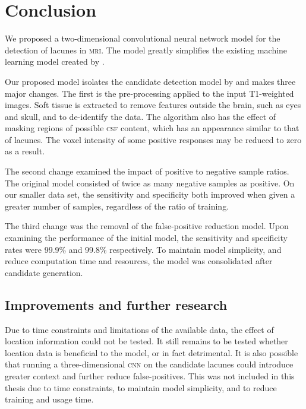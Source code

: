 %
%

\chapter{Conclusion}\label{conclusion}

We proposed a two-dimensional convolutional neural network model for the detection of lacunes in \textsc{mri}. The model greatly simplifies the existing machine learning model created by \cite{GhafoorianM.2017Dml3}.

Our proposed model isolates the candidate detection model by \cite{GhafoorianM.2017Dml3} and makes three major changes. The first is the pre-processing applied to the input T1-weighted images. Soft tissue is extracted to remove features outside the brain, such as eyes and skull, and to de-identify the data. The algorithm also has the effect of masking regions of possible \textsc{csf} content, which has an appearance similar to that of lacunes. The voxel intensity of some positive responses may be reduced to zero as a result.

The second change examined the impact of positive to negative sample ratios. The original model consisted of twice as many negative samples as positive. On our smaller data set, the sensitivity and specificity both improved when given a greater number of samples, regardless of the ratio of training.

The third change was the removal of the false-positive reduction model. Upon examining the performance of the initial model, the sensitivity and specificity rates were 99.9\% and 99.8\% respectively. To maintain model simplicity, and reduce computation time and resources, the model was consolidated after candidate generation.


\section{Improvements and further research}

Due to time constraints and limitations of the available data, the effect of location information could not be tested. It still remains to be tested whether location data is beneficial to the model, or in fact detrimental. It is also possible that running a three-dimensional \textsc{cnn} on the candidate lacunes could introduce greater context and further reduce false-positives. This was not included in this thesis due to time constraints, to maintain model simplicity, and to reduce training and usage time.

